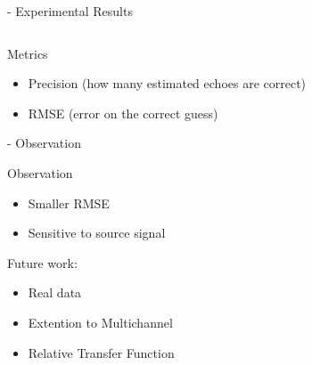 \begin{frame}[t]{\blaster - Experimental Results}
\begin{columns}[onlytextwidth]
\begin{column}{0.45\textwidth}
        \end{column}
    \end{columns}


    \begin{block}{Metrics}
        \begin{itemize}
            \item Precision (how many estimated echoes are correct)
            \item RMSE (error on the correct guess)
        \end{itemize}
    \end{block}

\end{frame}

\begin{frame}{\blaster - Observation}

    Observation
    \begin{itemize}
        \item[\cmark] Smaller RMSE
        \item[\xmark] Sensitive to source signal
    \end{itemize}

    Future work:
    \begin{itemize}
        \item Real data
        \item Extention to Multichannel
        \item Relative Transfer Function
    \end{itemize}

\end{frame}

\subsection{\lantern}

